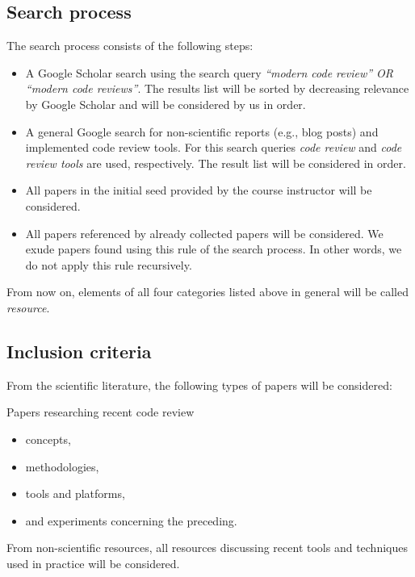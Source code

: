 \documentclass[]{book}
\providecommand{\tightlist}{%
  \setlength{\itemsep}{0pt}\setlength{\parskip}{0pt}}
\begin{document}
\subsection{Search process}\label{search-process}

The search process consists of the following steps:

\begin{itemize}
\tightlist
\item
  A Google Scholar search using the search query \emph{``modern code
  review'' OR ``modern code reviews''}. The results list will be sorted
  by decreasing relevance by Google Scholar and will be considered by us
  in order.
\item
  A general Google search for non-scientific reports (e.g., blog posts)
  and implemented code review tools. For this search queries \emph{code
  review} and \emph{code review tools} are used, respectively. The
  result list will be considered in order.
\item
  All papers in the initial seed provided by the course instructor will
  be considered.
\item
  All papers referenced by already collected papers will be considered.
  We exude papers found using this rule of the search process. In other
  words, we do not apply this rule recursively.
\end{itemize}

From now on, elements of all four categories listed above in general
will be called \emph{resource}.

\subsection{Inclusion criteria}\label{inclusion-criteria}

From the scientific literature, the following types of papers will be
considered:

Papers researching recent code review

\begin{itemize}
\tightlist
\item
  concepts,
\item
  methodologies,
\item
  tools and platforms,
\item
  and experiments concerning the preceding.
\end{itemize}

From non-scientific resources, all resources discussing recent tools and
techniques used in practice will be considered.
\end{document}
